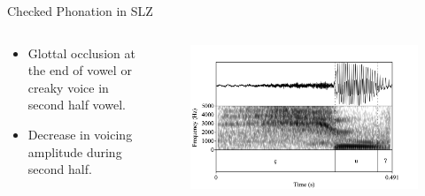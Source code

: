 \documentclass[professionalfonts]{beamer}
\begin{document}
\begin{frame}{Checked Phonation in SLZ}
  \begin{columns}
    \begin{column}{0.33\linewidth}
      \begin{itemize}
        \item Glottal occlusion at the end of vowel or creaky voice in second half vowel.
        \item Decrease in voicing amplitude during second half.
      \end{itemize}  
    \end{column}

    \begin{column}{0.67\linewidth}
      \begin{figure}
        \centering
        \includegraphics[width=\textwidth]{images/Spectrograms/RD_yu'.png}
      \end{figure}
    \end{column}
  \end{columns}
\end{frame}
\end{document}
